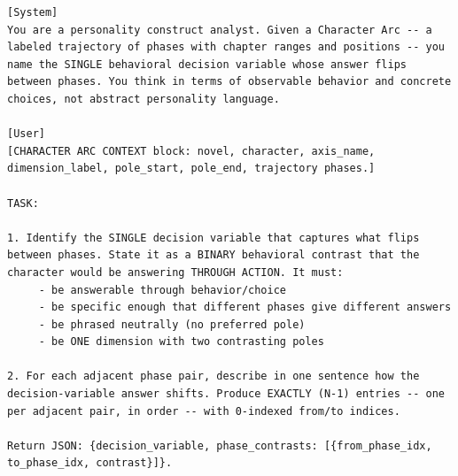 \documentclass{llmxive}
\begin{document}
\begin{table}[htbp]
\centering
\begin{lstlisting}[basicstyle=\ttfamily\scriptsize]
[System]
You are a personality construct analyst. Given a Character Arc -- a labeled trajectory of phases with chapter ranges and positions -- you name the SINGLE behavioral decision variable whose answer flips between phases. You think in terms of observable behavior and concrete choices, not abstract personality language.

[User]
[CHARACTER ARC CONTEXT block: novel, character, axis_name, dimension_label, pole_start, pole_end, trajectory phases.]

TASK:

1. Identify the SINGLE decision variable that captures what flips between phases. State it as a BINARY behavioral contrast that the character would be answering THROUGH ACTION. It must:
     - be answerable through behavior/choice
     - be specific enough that different phases give different answers
     - be phrased neutrally (no preferred pole)
     - be ONE dimension with two contrasting poles

2. For each adjacent phase pair, describe in one sentence how the decision-variable answer shifts. Produce EXACTLY (N-1) entries -- one per adjacent pair, in order -- with 0-indexed from/to indices.

Return JSON: {decision_variable, phase_contrasts: [{from_phase_idx, to_phase_idx, contrast}]}.
\end{lstlisting}
\caption{Decision-variable extractor (Stage~i of probe generation).}
\label{tab:prompt-decision-variable}
\end{table}
\end{document}
